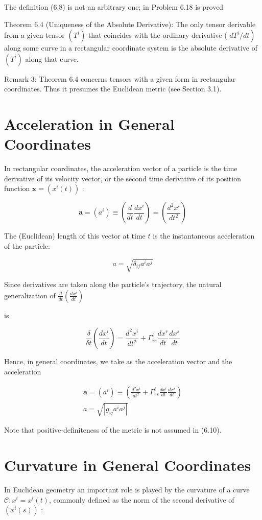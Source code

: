 \documentclass[10pt]{article}
\begin{document}
The definition (6.8) is not an arbitrary one; in Problem 6.18 is proved

Theorem 6.4 (Uniqueness of the Absolute Derivative): The only tensor derivable from a given tensor $\left(T^{i}\right)$ that coincides with the ordinary derivative ( $\left.d T^{i} / d t\right)$ along some curve in a rectangular coordinate system is the absolute derivative of $\left(T^{i}\right)$ along that curve.

Remark 3: Theorem 6.4 concerns tensors with a given form in rectangular coordinates. Thus it presumes the Euclidean metric (see Section 3.1).

\section*{Acceleration in General Coordinates}
In rectangular coordinates, the acceleration vector of a particle is the time derivative of its velocity vector, or the second time derivative of its position function $\mathbf{x}=\left(x^{i}(t)\right)$ :

$$
\mathbf{a}=\left(a^{i}\right) \equiv\left(\frac{d}{d t} \frac{d x^{i}}{d t}\right)=\left(\frac{d^{2} x^{i}}{d t^{2}}\right)
$$

The (Euclidean) length of this vector at time $t$ is the instantaneous acceleration of the particle:

$$
a=\sqrt{\delta_{i j} a^{i} a^{j}}
$$

Since derivatives are taken along the particle's trajectory, the natural generalization of $\frac{d}{d t}\left(\frac{d x^{i}}{d t}\right)$

is

$$
\frac{\delta}{\delta t}\left(\frac{d x^{i}}{d t}\right)=\frac{d^{2} x^{i}}{d t^{2}}+\Gamma_{r s}^{i} \frac{d x^{r}}{d t} \frac{d x^{s}}{d t}
$$

Hence, in general coordinates, we take as the acceleration vector and the acceleration


\begin{gather*}
\mathbf{a}=\left(a^{i}\right) \equiv\left(\frac{d^{2} x^{i}}{d t^{2}}+\Gamma_{r s}^{i} \frac{d x^{r}}{d t} \frac{d x^{s}}{d t}\right)  \tag{6.9}\\
a=\sqrt{\left|g_{i j} a^{i} a^{j}\right|} \tag{6.10}
\end{gather*}


Note that positive-definiteness of the metric is not assumed in (6.10).

\section*{Curvature in General Coordinates}
In Euclidean geometry an important role is played by the curvature of a curve $\mathscr{C}: x^{i}=x^{i}(t)$, commonly defined as the norm of the second derivative of $\left(x^{i}(s)\right)$ :
\end{document}
